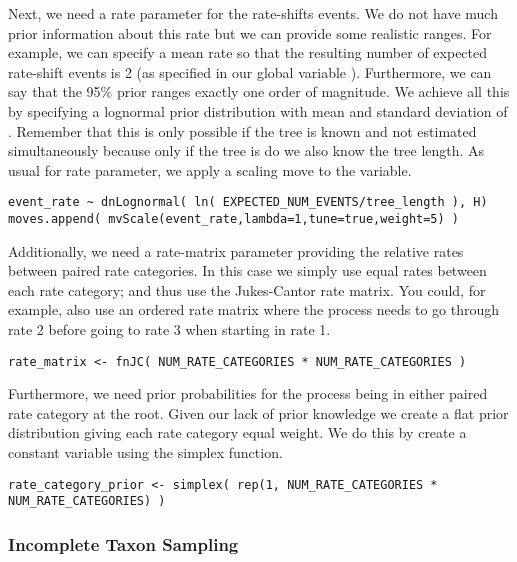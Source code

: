 Next, we need a rate parameter for the rate-shifts events.
We do not have much prior information about this rate but we can provide some realistic ranges.
For example, we can specify a mean rate so that the resulting number of expected rate-shift events is 2 (as specified in our global variable ).
Furthermore, we can say that the 95\% prior ranges exactly one order of magnitude.
We achieve all this by specifying a lognormal prior distribution with mean  and standard deviation of .
Remember that this is only possible if the tree is known and not estimated simultaneously because only if the tree is do we also know the tree length.
As usual for rate parameter, we apply a scaling move to the  variable.
{\tt \begin{snugshade*}
\begin{lstlisting}
event_rate ~ dnLognormal( ln( EXPECTED_NUM_EVENTS/tree_length ), H)
moves.append( mvScale(event_rate,lambda=1,tune=true,weight=5) )
\end{lstlisting}
\end{snugshade*}}

Additionally, we need a rate-matrix parameter providing the relative rates between paired rate categories.
In this case we simply use equal rates between each rate category; and thus use the Jukes-Cantor rate matrix.
You could, for example, also use an ordered rate matrix where the process needs to go through rate 2 before going to rate 3 when starting in rate 1.
{\tt \begin{snugshade*}
\begin{lstlisting}
rate_matrix <- fnJC( NUM_RATE_CATEGORIES * NUM_RATE_CATEGORIES )
\end{lstlisting}
\end{snugshade*}}
Furthermore, we need prior probabilities for the process being in either paired rate category at the root.
Given our lack of prior knowledge we create a flat prior distribution giving each rate category equal weight.
We do this by create a constant variable using the simplex function.
{\tt \begin{snugshade*}
\begin{lstlisting}
rate_category_prior <- simplex( rep(1, NUM_RATE_CATEGORIES * NUM_RATE_CATEGORIES) )
\end{lstlisting}
\end{snugshade*}}



\subsubsection{Incomplete Taxon Sampling}

